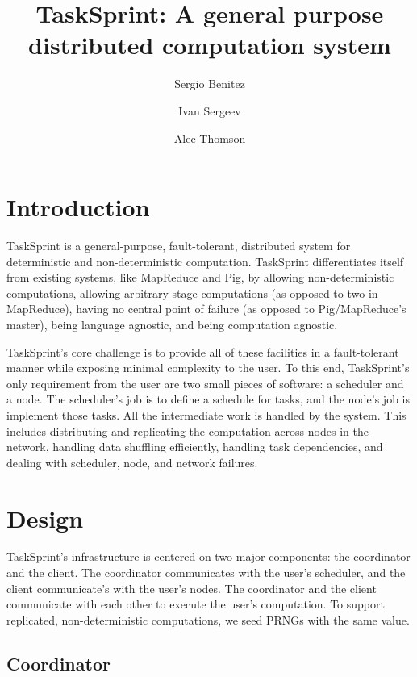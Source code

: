 \documentclass [11pt, twocolumn] {article}
\begin{document}
 

\title { TaskSprint: A general purpose distributed computation system }
\author{ Sergio Benitez \and  Ivan Sergeev \and Alec Thomson  }
\date {}

\maketitle

\section {Introduction} 
TaskSprint is a general-purpose, fault-tolerant, distributed system for deterministic and non-deterministic computation. TaskSprint differentiates itself from existing systems, like MapReduce and Pig, by allowing non-deterministic computations, allowing arbitrary stage computations (as opposed to two in MapReduce), having no central point of failure (as opposed to Pig/MapReduce's master), being language agnostic, and being computation agnostic.

TaskSprint's core challenge is to provide all of these facilities in a fault-tolerant manner while exposing minimal complexity to the user. To this end, TaskSprint's only requirement from the user are two small pieces of software: a scheduler and a node. The scheduler's job is to define a schedule for tasks, and the node's job is implement those tasks. All the intermediate work is handled by the system. This includes distributing and replicating the computation across nodes in the network, handling data shuffling efficiently, handling task dependencies, and dealing with scheduler, node, and network failures.

\section {Design}

TaskSprint's infrastructure is centered on two major components: the coordinator and the client. The coordinator communicates with the user's scheduler, and the client communicate's with the user's nodes. The coordinator and the client communicate with each other to execute the user's computation. To support replicated, non-deterministic computations, we seed PRNGs with the same value.

\subsection {Coordinator} 
\end{document}
